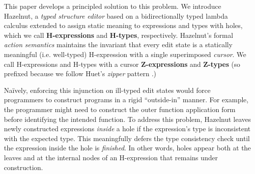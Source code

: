 This paper develops a principled solution to this problem. We introduce Hazelnut,  a \emph{typed structure editor}  based on a bidirectionally typed lambda calculus extended to assign static meaning to expressions and types with {holes}, which we call \textbf{H-expressions} and \textbf{H-types}, respectively. Hazelnut's formal \emph{action semantics} maintains the invariant that every edit state is a statically meaningful (i.e. well-typed) H-expression with a single superimposed \emph{cursor}. We call H-expressions and H-types with a cursor \textbf{Z-expressions} and \textbf{Z-types} (so prefixed because we follow Huet's \emph{zipper} pattern \cite{JFP::Huet1997}.) %

Na\"ively, enforcing this injunction on ill-typed edit states would force programmers to construct programs in a rigid ``outside-in'' manner. For example, the programmer might need to construct the outer function application form before identifying the intended function. To address this problem, Hazelnut leaves newly constructed expressions \emph{inside} a hole if the expression's type is inconsistent with the expected type. This meaningfully defers the type consistency check until the expression inside the hole is \emph{finished}. In other words, holes appear both at the leaves and at the internal nodes of an H-expression that remains under construction. %




